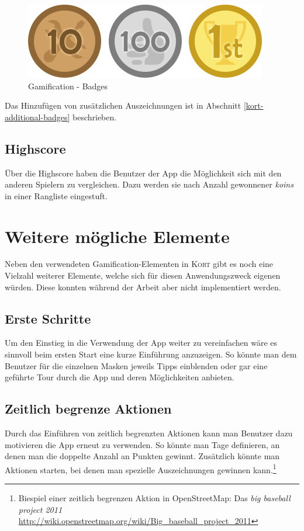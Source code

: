 \begin{figure}[H]
	\centering
	\includegraphics[scale=0.7]{images/gamification/gamification-badges}
	\caption{Gamification - Badges}
	\label{gamification-badges}
\end{figure}

Das Hinzufügen von zusätzlichen Auszeichnungen ist in Abschnitt \ref{kort-additional-badges} beschrieben.

\subsection{Highscore}
Über die Highscore haben die Benutzer der App die Möglichkeit sich mit den anderen Spielern zu vergleichen.
Dazu werden sie nach Anzahl gewonnener \emph{koins} in einer Rangliste eingestuft.

\section{Weitere mögliche Elemente}
Neben den verwendeten Gamification-Elementen in \textsc{Kort} gibt es noch eine Vielzahl weiterer Elemente, welche sich für diesen Anwendungszweck eigenen würden.
Diese konnten während der Arbeit aber nicht implementiert werden.

\subsection{Erste Schritte}
Um den Einstieg in die Verwendung der App weiter zu vereinfachen wäre es sinnvoll beim ersten Start eine kurze Einführung anzuzeigen.
So könnte man dem Benutzer für die einzelnen Masken jeweils Tipps einblenden oder gar eine geführte Tour durch die App und deren Möglichkeiten anbieten.

\subsection{Zeitlich begrenze Aktionen}
Durch das Einführen von zeitlich begrenzten Aktionen kann man Benutzer dazu motivieren die App erneut zu verwenden.
So könnte man Tage definieren, an denen man die doppelte Anzahl an Punkten gewinnt.
Zusätzlich könnte man Aktionen starten, bei denen man spezielle Auszeichnungen gewinnen kann.\footnote{Biespiel einer zeitlich begrenzen Aktion in OpenStreetMap: Das \emph{big baseball project 2011} \url{http://wiki.openstreetmap.org/wiki/Big_baseball_project_2011}}

